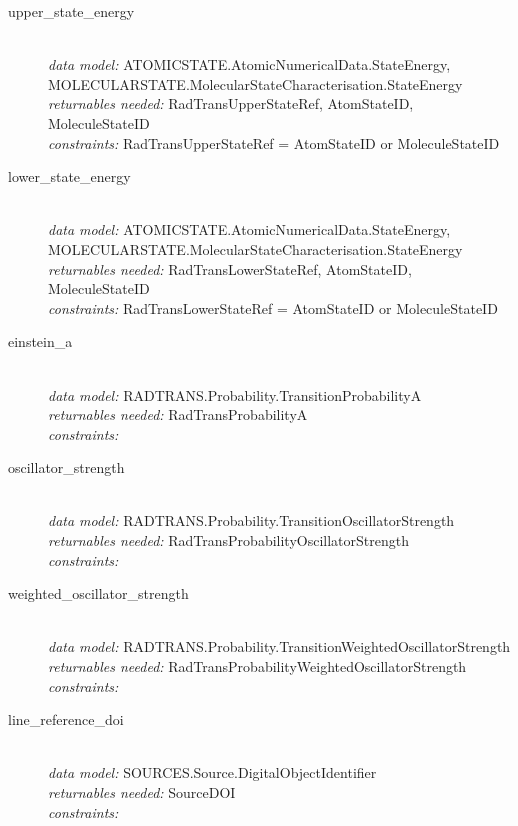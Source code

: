\documentclass[11pt,a4paper]{ivoa}
\begin{document}
\begin{description}
	\item [upper\_state\_energy]\hfill\\
	\textit{data model:} ATOMICSTATE.AtomicNumericalData.StateEnergy, \\ 
MOLECULARSTATE.MolecularStateCharacterisation.StateEnergy\\
	\textit{returnables needed:} RadTransUpperStateRef, AtomStateID, 
MoleculeStateID\\
	\textit{constraints:} 
 RadTransUpperStateRef = AtomStateID or MoleculeStateID
	
	\item [lower\_state\_energy]\hfill\\
	\textit{data model:} ATOMICSTATE.AtomicNumericalData.StateEnergy, \\ 
MOLECULARSTATE.MolecularStateCharacterisation.StateEnergy\\
	\textit{returnables needed:} RadTransLowerStateRef, AtomStateID,  
MoleculeStateID\\
	\textit{constraints:}  RadTransLowerStateRef = AtomStateID or MoleculeStateID

	\item [einstein\_a]\hfill\\
	\textit{data model:}  RADTRANS.Probability.TransitionProbabilityA\\
	\textit{returnables needed:} RadTransProbabilityA\\
	\textit{constraints:}

	\item [oscillator\_strength]\hfill\\
	\textit{data model:}  RADTRANS.Probability.TransitionOscillatorStrength\\
	\textit{returnables needed:} RadTransProbabilityOscillatorStrength\\
        \textit{constraints:}

	\item [weighted\_oscillator\_strength]\hfill\\
	\textit{data model:}  RADTRANS.Probability.TransitionWeightedOscillatorStrength\\
	\textit{returnables needed:} RadTransProbabilityWeightedOscillatorStrength\\
 	   \textit{constraints:}

	\item [line\_reference\_doi]\hfill\\
	\textit{data model:} SOURCES.Source.DigitalObjectIdentifier\\
	\textit{returnables needed:} SourceDOI\\
	\textit{constraints:}


\end{description}
\end{document}
